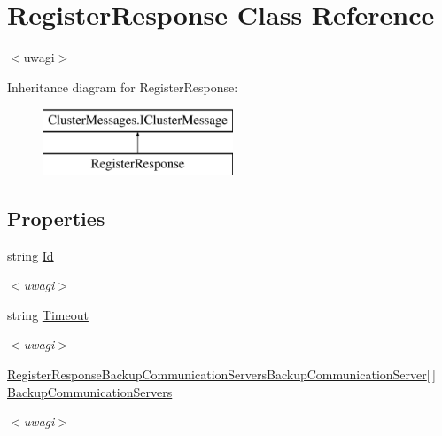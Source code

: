 \hypertarget{class_register_response}{}\section{Register\+Response Class Reference}
\label{class_register_response}


$<$uwagi$>$  


Inheritance diagram for Register\+Response\+:\begin{figure}[H]
\begin{center}
\leavevmode
\includegraphics[height=2.000000cm]{class_register_response}
\end{center}
\end{figure}
\subsection*{Properties}
\begin{DoxyCompactItemize}
\item 
\hypertarget{class_register_response_a8a4fdb8d50e4dde3d47365b120073bf5}{}string \hyperlink{class_register_response_a8a4fdb8d50e4dde3d47365b120073bf5}{Id}\label{class_register_response_a8a4fdb8d50e4dde3d47365b120073bf5}

\begin{DoxyCompactList}\small\item\em $<$uwagi$>$ \end{DoxyCompactList}\item 
\hypertarget{class_register_response_afcae35bb252e654026ceddbdab15cf69}{}string \hyperlink{class_register_response_afcae35bb252e654026ceddbdab15cf69}{Timeout}\label{class_register_response_afcae35bb252e654026ceddbdab15cf69}

\begin{DoxyCompactList}\small\item\em $<$uwagi$>$ \end{DoxyCompactList}\item 
\hypertarget{class_register_response_ab458693fb9c4b000973ec85adf1d3c60}{}\hyperlink{class_register_response_backup_communication_servers_backup_communication_server}{Register\+Response\+Backup\+Communication\+Servers\+Backup\+Communication\+Server}\mbox{[}$\,$\mbox{]} \hyperlink{class_register_response_ab458693fb9c4b000973ec85adf1d3c60}{Backup\+Communication\+Servers}\label{class_register_response_ab458693fb9c4b000973ec85adf1d3c60}

\begin{DoxyCompactList}\small\item\em $<$uwagi$>$ \end{DoxyCompactList}\end{DoxyCompactItemize}


